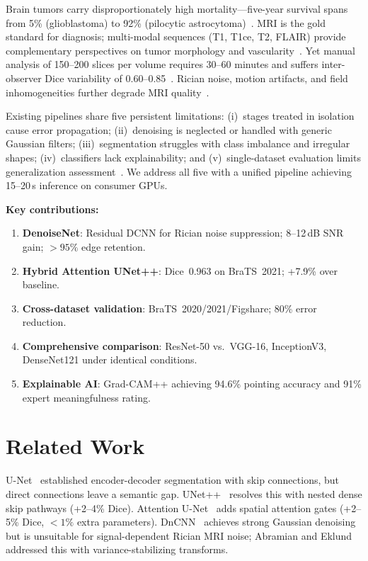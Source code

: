 \documentclass[sn-mathphys-num]{sn-jnl}
\begin{document}
Brain tumors carry disproportionately high mortality---five-year survival spans from 5\%
(glioblastoma) to 92\% (pilocytic astrocytoma)~\cite{b1}. MRI is the gold standard for
diagnosis; multi-modal sequences (T1, T1ce, T2, FLAIR) provide complementary
perspectives on tumor morphology and vascularity~\cite{b2,b3}. Yet manual analysis of
150--200 slices per volume requires 30--60 minutes and suffers inter-observer Dice
variability of 0.60--0.85~\cite{b4,b5}. Rician noise, motion artifacts, and field
inhomogeneities further degrade MRI quality~\cite{b6,b7}.

Existing pipelines share five persistent limitations: (i)~stages treated in isolation
cause error propagation; (ii)~denoising is neglected or handled with generic Gaussian
filters; (iii)~segmentation struggles with class imbalance and irregular shapes;
(iv)~classifiers lack explainability; and (v)~single-dataset evaluation limits
generalization assessment~\cite{b12,b13,b14,b15,b16}. We address all five with a unified
pipeline achieving 15--20\,s inference on consumer GPUs.

\textbf{Key contributions:}
\begin{enumerate}[noitemsep,topsep=2pt]
  \item \textbf{DenoiseNet}: Residual DCNN for Rician noise suppression; 8--12\,dB SNR
    gain; $>95\%$ edge retention.
  \item \textbf{Hybrid Attention UNet++}: Dice~0.963 on BraTS~2021; +7.9\% over
    baseline.
  \item \textbf{Cross-dataset validation}: BraTS~2020/2021/Figshare; 80\% error
    reduction.
  \item \textbf{Comprehensive comparison}: ResNet-50 vs.\ VGG-16, InceptionV3,
    DenseNet121 under identical conditions.
  \item \textbf{Explainable AI}: Grad-CAM++ achieving 94.6\% pointing accuracy and 91\%
    expert meaningfulness rating.
\end{enumerate}

\section{Related Work}\label{sec:related}

U-Net~\cite{b7} established encoder-decoder segmentation with skip connections, but
direct connections leave a semantic gap. UNet++~\cite{b14} resolves this with nested
dense skip pathways (+2--4\% Dice). Attention U-Net~\cite{b15} adds spatial attention
gates (+2--5\% Dice, $<1\%$ extra parameters). DnCNN~\cite{b18} achieves strong
Gaussian denoising but is unsuitable for signal-dependent Rician MRI noise; Abramian
and Eklund~\cite{b29} addressed this with variance-stabilizing transforms.
\end{document}
